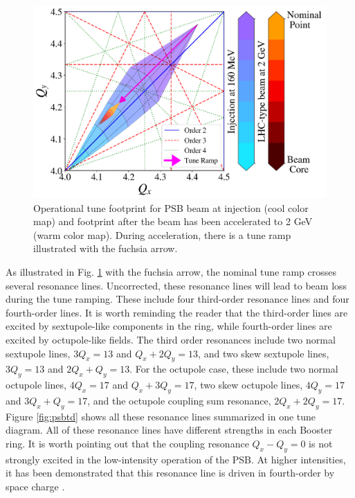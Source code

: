 \begin{figure}[H]
    \centering
    \includegraphics[width=\linewidth,keepaspectratio]{chapter5/operational.png}
    \caption{Operational tune footprint for PSB beam at injection (cool color map) and footprint after the beam has been accelerated to 2 GeV (warm color map). During acceleration, there is a tune ramp illustrated with the fuchsia arrow.}
    \label{fig:operational_psb}
   \vspace{-1.25em}
\end{figure}

As illustrated in Fig. \ref{fig:operational_psb} with the fuchsia arrow, the nominal tune ramp crosses several resonance lines. Uncorrected, these resonance lines will lead to beam loss during the tune ramping. These include four third-order resonance lines and four fourth-order lines. It is worth reminding the reader that the third-order lines are excited by sextupole-like components in the ring, while fourth-order lines are excited by octupole-like fields. The third order resonances include two normal sextupole lines, $3Q_x = 13$ and $Q_x+2Q_y = 13$, and two skew sextupole lines, $3Q_y = 13$ and $2Q_x+Q_y = 13$. For the octupole case, these include two normal octupole lines, $4Q_x = 17$ and $Q_x+3Q_y = 17$, two skew octupole lines, $4Q_y = 17$ and $3Q_x+Q_y = 17$, and the octupole coupling sum resonance, $2Q_x +2Q_y =17$. Figure \ref{fig:psbtd} shows all these resonance lines summarized in one tune diagram. All of these resonance lines have different strengths in each Booster ring. It is worth pointing out that the coupling resonance $Q_x - Q_y = 0$ is not strongly excited in the low-intensity operation of the PSB. At higher intensities, it has been demonstrated that this resonance line is driven in fourth-order by space charge \cite{foteinithesis}.

